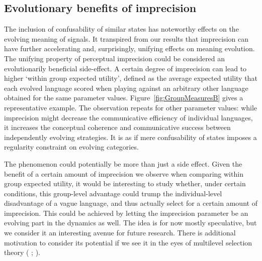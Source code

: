 \documentclass[11pt,english]{article}
\numberwithin{equation}{section}
\newcommand{\citealtbjps}[1]{\citeauthor{#1} \citeyear{#1}}
\begin{document}

\subsection{Evolutionary benefits of imprecision}
The inclusion of confusability of similar states has noteworthy effects on the evolving meaning
of signals.  It transpired from our results that imprecision can have further accelerating and,
surprisingly, unifying effects on meaning evolution.  The unifying property of perceptual
imprecision could be considered an evolutionarily beneficial side-effect. A certain degree of
imprecision can lead to higher `within group expected utility', defined as the average
expected utility that each evolved language scored when playing against an arbitrary other
language obtained for the same parameter values. Figure~\ref{fig:GroupMeasuresB} gives a
representative example. The observation repeats for other parameter values: while imprecision
might decrease the communicative efficiency of individual languages, it increases the
conceptual coherence and communicative success between independently evolving strategies. It is
as if mere confusability of states imposes a regularity constraint on evolving categories.

The phenomenon could potentially be more than just a side effect.  Given the benefit of a certain
amount of imprecision we observe when comparing within group expected utility, it would be
interesting to study whether, under certain conditions, this group-level advantage could trump
the individual-level disadvantage of a vague language, and thus actually select for a certain
amount of imprecision.  This could be achieved by letting the imprecision parameter be an
evolving part in the dynamics as well. The idea is for now mostly speculative, but we consider
it an interesting avenue for future research.  There is additional motivation to consider its
potential if we see it in the eyes of multilevel selection theory
(\citealtbjps{Wilson1994}; \citealtbjps{OGorman2008}).
\end{document}
